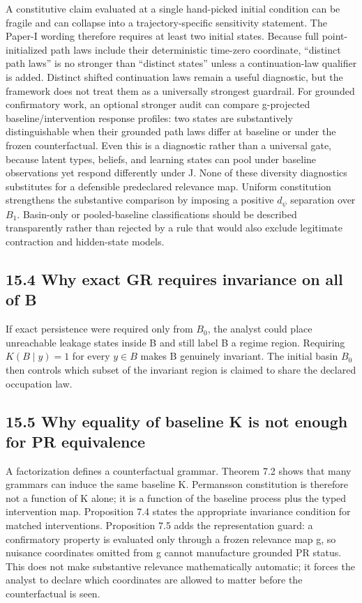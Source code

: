 \documentclass[10pt]{article}
\begin{document}
A constitutive claim evaluated at a single hand-picked initial condition
can be fragile and can collapse into a trajectory-specific sensitivity
statement. The Paper-I wording therefore requires at least two initial
states. Because full point-initialized path laws include their
deterministic time-zero coordinate, ``distinct path laws'' is no
stronger than ``distinct states'' unless a continuation-law qualifier is
added. Distinct shifted continuation laws remain a useful diagnostic,
but the framework does not treat them as a universally strongest guardrail. For
grounded confirmatory work, an optional stronger audit can compare
g-projected baseline/intervention response profiles: two states are
substantively distinguishable when their grounded path laws differ at
baseline or under the frozen counterfactual. Even this is a diagnostic
rather than a universal gate, because latent types, beliefs, and
learning states can pool under baseline observations yet respond
differently under J. None of these diversity diagnostics substitutes for
a defensible predeclared relevance map. Uniform constitution strengthens
the substantive comparison by imposing a positive \(d_\psi\) separation
over \(B_1\). Basin-only or pooled-baseline classifications should be
described transparently rather than rejected by a rule that would also
exclude legitimate contraction and hidden-state models.

\subsection{15.4 Why exact GR requires invariance on all of
B}\label{why-exact-gr-requires-invariance-on-all-of-b}

If exact persistence were required only from \(B_0\), the analyst could
place unreachable leakage states inside B and still label B a regime
region. Requiring \(K(B\mid y)=1\) for every \(y\in{}B\) makes B
genuinely invariant. The initial basin \(B_0\) then controls which
subset of the invariant region is claimed to share the declared
occupation law.

\subsection{15.5 Why equality of baseline K is not enough for PR
equivalence}\label{why-equality-of-baseline-k-is-not-enough-for-pr-equivalence}

A factorization defines a counterfactual grammar. Theorem 7.2 shows that
many grammars can induce the same baseline K. Permansson constitution is
therefore not a function of K alone; it is a function of the baseline
process plus the typed intervention map. Proposition 7.4 states the
appropriate invariance condition for matched interventions. Proposition
7.5 adds the representation guard: a confirmatory property is evaluated
only through a frozen relevance map g, so nuisance coordinates omitted
from g cannot manufacture grounded PR status. This does not make
substantive relevance mathematically automatic; it forces the analyst to
declare which coordinates are allowed to matter before the
counterfactual is seen.
\end{document}
